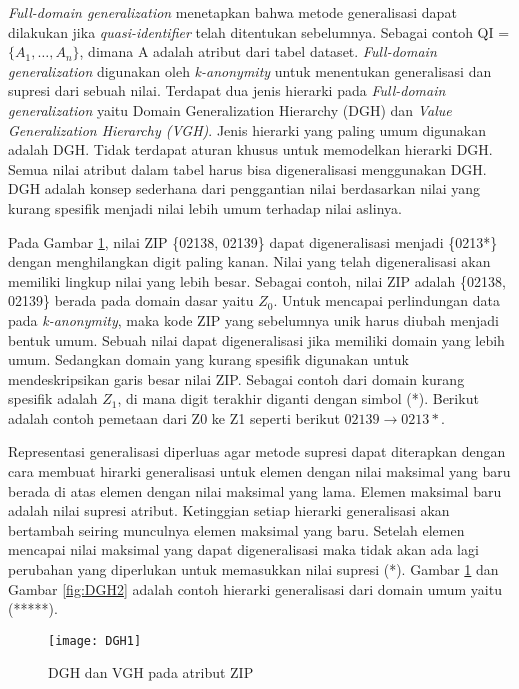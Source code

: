 \par \textit{Full-domain generalization} menetapkan bahwa metode generalisasi dapat dilakukan jika \textit{quasi-identifier} telah ditentukan sebelumnya. Sebagai contoh QI = $\{A_1, \ldots , A_n\}$, dimana A adalah atribut dari tabel dataset. \textit{Full-domain generalization} digunakan oleh \textit{k-anonymity} untuk menentukan generalisasi dan supresi dari sebuah nilai. Terdapat dua jenis hierarki pada \textit{Full-domain generalization} yaitu Domain Generalization Hierarchy (DGH) dan \textit{Value Generalization Hierarchy (VGH)}. Jenis hierarki yang paling umum digunakan adalah DGH. Tidak terdapat aturan khusus untuk memodelkan hierarki DGH. Semua nilai atribut dalam tabel harus bisa digeneralisasi menggunakan DGH. DGH adalah konsep sederhana dari penggantian nilai berdasarkan nilai yang kurang spesifik menjadi nilai lebih umum terhadap nilai aslinya. 

Pada Gambar \ref{fig:DGH1}, nilai ZIP \{02138, 02139\} dapat digeneralisasi menjadi \{0213*\} dengan menghilangkan digit paling kanan. Nilai yang telah digeneralisasi akan memiliki lingkup nilai yang lebih besar. Sebagai contoh, nilai ZIP adalah \{02138, 02139\} berada pada domain dasar yaitu $Z_0$. Untuk mencapai perlindungan data pada \textit{k-anonymity}, maka kode ZIP yang sebelumnya unik harus diubah menjadi bentuk umum. Sebuah nilai dapat digeneralisasi jika memiliki domain yang lebih umum. Sedangkan domain yang kurang spesifik digunakan untuk mendeskripsikan garis besar nilai ZIP. Sebagai contoh dari domain kurang spesifik adalah $Z_1$, di mana digit terakhir diganti dengan simbol (*). Berikut adalah contoh pemetaan dari Z0 ke Z1 seperti berikut $02139 \rightarrow 0213*$.

Representasi generalisasi diperluas agar metode supresi dapat diterapkan dengan cara membuat hirarki generalisasi untuk elemen dengan nilai maksimal yang baru berada di atas elemen dengan nilai maksimal yang lama. Elemen maksimal baru adalah nilai supresi atribut. Ketinggian setiap hierarki generalisasi akan bertambah seiring munculnya elemen maksimal yang baru. Setelah elemen mencapai nilai maksimal yang dapat digeneralisasi maka tidak akan ada lagi perubahan yang diperlukan untuk memasukkan nilai supresi (*). Gambar \ref{fig:DGH1} dan Gambar \ref{fig:DGH2} adalah contoh hierarki generalisasi dari domain umum yaitu (*****). 

\begin{figure}[H]
	\centering
	\texttt{[image: DGH1]}
	\caption{DGH dan VGH pada atribut ZIP}
	\label{fig:DGH1}
\end{figure}

